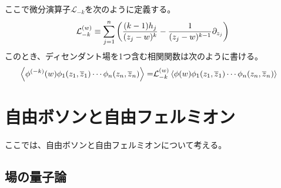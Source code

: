 \documentclass[11pt, dvipdfmx]{article}
\numberwithin{equation}{section}
\begin{document}
ここで微分演算子$\mathcal{L}_{-k}$を次のように定義する。
\begin{align}
    \mathcal{L}_{-k}^{(w)}\equiv \sum_{j=1}^{n}\qty(\frac{(k-1)h_j}{(z_j - w)^k} - \frac{1}{(z_j - w)^{k-1}}\partial_{z_j})
\end{align}
このとき、ディセンダント場を1つ含む相関関数は次のように書ける。
\begin{align}
    \ev{\phi^{(-k)}(w)\phi_1(z_1,\overline{z}_1)\cdots \phi_n(z_n,\overline{z}_n)}=&\mathcal{L}_{-k}^{(w)}\ev{\phi(w)\phi_1(z_1,\overline{z}_1)\cdots \phi_n(z_n,\overline{z}_n)}
\end{align}
\section{自由ボソンと自由フェルミオン}
ここでは、自由ボソンと自由フェルミオンについて考える。
\subsection{場の量子論}
\end{document}
